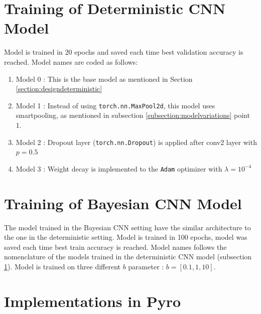 \documentclass[ %
                    author={Revalda Putawara},
                supervisor={Dr. James Pope},
                    degree={MSc},
                     title={Robustness of Bayesian Neural Networks Design Choices Against Weight and Bias Perturbation Induced by Single Event Upsets (SEUs)},
                      type={},
                      year={2025}]{dissertation}
\begin{document}
\section{Training of Deterministic CNN Model} \label{subsection:trainingdeterministiccnn}

Model is trained in 20 epochs and saved each time best validation accuracy is reached. Model names are coded as follows:
\begin{enumerate}
\item Model 0 : This is the base model as mentioned in Section \ref{section:designdeterministic}
\item Model 1 : Instead of using \texttt{torch.nn.MaxPool2d}, this model uses smartpooling, as mentioned in subsection \ref{subsection:modelvariations} point 1.
\item Model 2 : Dropout layer (\texttt{torch.nn.Dropout}) is applied after conv2 layer with $p=0.5$
\item Model 3 : Weight decay is implemented to the \texttt{Adam} optimizer with $\lambda = 10^{-4}$
\end {enumerate}

\section{Training of Bayesian CNN Model}

The model trained in the Bayesian CNN setting have the similar architecture to the one in the deterministic setting. Model is trained in 100 epochs, model was saved each time best train accuracy is reached. Model names follows the nomenclature of the models trained in the deterministic CNN model (subsection \ref{subsection:trainingdeterministiccnn}). Model is trained on three different $b$ parameter : $b = [0.1, 1, 10]$.


\section{Implementations in Pyro}

\end{document}
